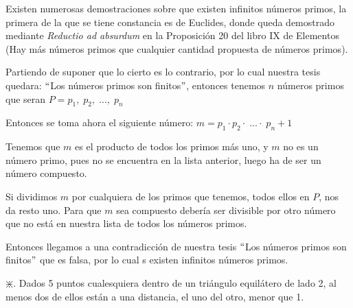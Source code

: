 		\begin{proofw}\renewcommand{\qedsymbol}{$\diamond$}
		
		Existen numerosas demostraciones sobre que existen infinitos números primos, la primera de la que se tiene constancia es de Euclides, donde queda demostrado mediante 	\emph{Reductio ad absurdum} en la Proposición 20 del libro IX de Elementos (Hay más números primos que cualquier cantidad propuesta de números primos).
		
		Partiendo de suponer que lo cierto es lo contrario, por lo cual nuestra tesis quedara: $``$Los números primos son finitos$"$, entonces tenemos $n$ números primos que seran $P=p_1,\; p_2,\; ...,\; p_n$

		Entonces se toma ahora el siguiente número: $m=p_1 \cdot p_2 \cdot \; ...\cdot\; p_n+1$

		Tenemos que $m$ es el producto de todos los primos más uno, y $m$ no es un número primo, pues no se encuentra en la lista anterior, luego ha de ser un número compuesto.

 		Si dividimos $m$ por cualquiera de los primos que tenemos, todos ellos en $P$, nos da resto uno. Para que $m$ sea compuesto debería ser divisible por otro número que no está en nuestra lista de todos los números primos.
		
		Entonces llegamos a una contradicción de nuestra tesis $``$Los números primos son finitos$"$ que es falsa, por lo cual s existen infinitos números primos.
		\end{proofw}
		
		\begin{ejre} $\divideontimes$.
			Dados 5 puntos cualesquiera dentro de un triángulo equilátero de lado 2, al menos dos de ellos están a una distancia, el uno del otro, menor que 1.
		\end{ejre}
		

